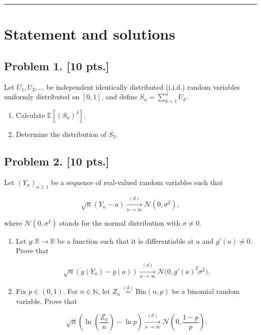 \documentclass[11pt,a4paper]{article}
\begin{document}
\noindent\rule{\linewidth}{0.4pt}

\section{Statement and solutions}

\subsection{Problem 1. [10 pts.]}
Let \( U_1, U_2, \dots \) be independent identically distributed (i.i.d.) random variables uniformly distributed on \( [0, 1] \), and define \( S_n = \sum_{k=1}^n U_k \).
\begin{enumerate}[label=(\alph*)]
    \item Calculate \( \mathbb{E}[(S_n)^4] \).
    \item Determine the distribution of \( S_3 \).
\end{enumerate}

\subsection{Problem 2. [10 pts.]}
Let \( (Y_n)_{n \ge 1} \) be a sequence of real-valued random variables such that

\[
\sqrt{n}(Y_n - a) \xrightarrow[n \to \infty]{(d)} \mathcal{N}(0, \sigma^2),
\]

where \( \mathcal{N}(0, \sigma^2) \) stands for the normal distribution with \( \sigma \neq 0 \).
\begin{enumerate}[label=(\alph*)]
    \item Let \( g : \mathbb{R} \to \mathbb{R} \) be a function such that it is differentiable at \( a \) and \( g'(a) \neq 0 \). Prove that

    \[
    \sqrt{n}(g(Y_n) - g(a)) \xrightarrow[n \to \infty]{(d)} \mathcal{N}\bigl(0, g'(a)^2 \sigma^2\bigr).
    \]
    \item Fix \( p \in (0, 1) \). For \( n \in \mathbb{N} \), let \( Z_n \stackrel{(d)}{=} \mathrm{Bin}(n, p) \) be a binomial random variable. Prove that

    \[
    \sqrt{n} \left( \ln\left(\frac{Z_n}{n}\right) - \ln p \right) \xrightarrow[n \to \infty]{(d)} \mathcal{N}\left(0, \frac{1-p}{p}\right).
    \]
\end{enumerate}
\end{document}
